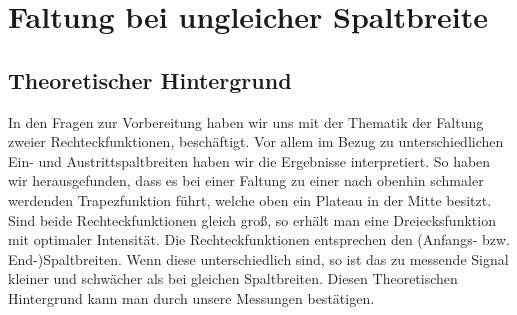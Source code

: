 \section{Faltung bei ungleicher Spaltbreite}
\subsection* {Theoretischer Hintergrund}
In den Fragen zur Vorbereitung haben wir uns mit der Thematik der Faltung zweier Rechteckfunktionen, besch\"aftigt. Vor allem im Bezug zu unterschiedlichen Ein- und Austrittspaltbreiten haben wir die 
Ergebnisse interpretiert. So haben wir herausgefunden, dass es bei einer Faltung zu einer nach obenhin schmaler werdenden Trapezfunktion f\"uhrt, welche oben ein Plateau in der Mitte besitzt. \\
Sind beide Rechteckfunktionen gleich gro\ss{}, so erh\"alt man eine Dreiecksfunktion mit optimaler Intensit\"at. Die Rechteckfunktionen entsprechen den (Anfangs- bzw. End-)Spaltbreiten. Wenn diese 
unterschiedlich sind, so ist das zu messende Signal kleiner und schw\"acher als bei gleichen Spaltbreiten. Diesen Theoretischen Hintergrund kann man durch unsere Messungen best\"atigen. 

